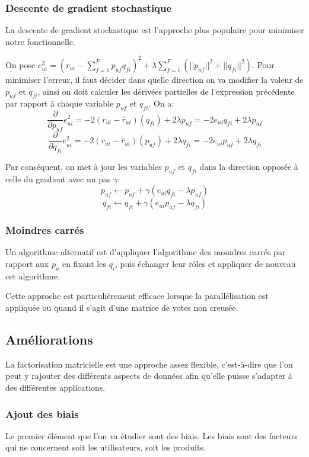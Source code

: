 \documentclass{article}
\theoremstyle{plain}
\theoremstyle{definition}
\theoremstyle{remark}
\begin{document}
\subsubsection{Descente de gradient stochastique}
La descente de gradient stochastique est l'approche plus populaire pour minimiser notre fonctionnelle.

On pose $e_{ui}^2=(r_{ui}-\sum_{f=1}^{F}p_{uf}q_{fi})^2+\lambda\sum_{f=1}^{F}(||p_{uf}||^2+||q_{fi}||^2)$. Pour minimiser l'erreur, il faut d\'ecider dans quelle direction on va modifier la valeur de $p_{uf}$ et $q_{fi}$, ainsi on doit calculer les d\'eriv\'ees partielles de l'expression pr\'ec\'edente par rapport \`a chaque variable $p_{uf}$ et $q_{fi}$. On a:
\[
\frac{\partial}{\partial p_{uf}}e_{ui}^2=-2(r_{ui}-\hat{r}_{ui})(q_{fi})+2\lambda p_{uf}=-2e_{ui}q_{fi}+2\lambda p_{uf}
\]
\[
\frac{\partial}{\partial q_{fi}}e_{ui}^2=-2(r_{ui}-\hat{r}_{ui})(p_{uf})+2\lambda q_{fi}=-2e_{ui}p_{uf}+2\lambda q_{fi}
\]

Par cons\'equent, on met \`a jour les variables $p_{uf}$ et $q_{fi}$ dans la direction oppos\'ee \`a celle du gradient avec un pas $\gamma$:
\[
p_{uf}\leftarrow p_{uf}+\gamma(e_{ui}q_{fi}-\lambda p_{uf})
\]
\[
q_{fi}\leftarrow q_{fi}+\gamma(e_{ui}p_{uf}-\lambda q_{fi})
\]

\subsubsection{Moindres carr\'es}
Un algorithme alternatif est d'appliquer l'algorithme des moindres carr\'es par rapport aux $p_u$ en fixant les $q_i$, puis \'echanger leur r\^oles et appliquer de nouveau cet algorithme.

Cette approche est particuli\`erement efficace lorsque la parall\'elisation est appliqu\'ee ou quand il s'agit d'une matrice de votes non creus\'ee.

\subsection{Am\'eliorations}
La factorisation matricielle est une approche assez flexible, c'est-\`a-dire que l'on peut y rajouter des diff\'erents aspects de donn\'ees afin qu'elle puisse s'adapter \`a des diff\'erentes applications.

\subsubsection{Ajout des biais}
Le premier \'el\'ement que l'on va \'etudier sont des biais. Les biais sont des facteurs qui ne concernent soit les utilisateurs, soit les produits. 
\end{document}
